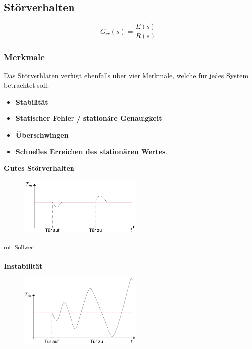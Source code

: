 \documentclass[
  10pt,
  a4paper,
  twocolumn]{article}
\providecommand{\tightlist}{%
  \setlength{\itemsep}{0pt}\setlength{\parskip}{0pt}}\usepackage{longtable,booktabs,array}
\numberwithin{equation}{section}
\begin{document}
\hypertarget{stuxf6rverhalten}{%
\subsection{Störverhalten}\label{stuxf6rverhalten}}

\[
G_{er}(s)=\frac{E(s)}{R(s)}
\]

\hypertarget{merkmale-1}{%
\subsubsection{Merkmale}\label{merkmale-1}}

Das Störverhlaten verfügt ebenfalls über vier Merkmale, welche für jedes
System betrachtet soll:

\begin{itemize}
\tightlist
\item
  \textbf{Stabilität}
\item
  \textbf{Statischer Fehler /} \textbf{stationäre Genauigkeit}
\item
  \textbf{Überschwingen}
\item
  \textbf{Schnelles Erreichen des stationären Wertes}.
\end{itemize}

\textbf{Gutes Störverhalten}

\begin{figure}[H]

{\centering \includegraphics[width=6cm,height=\textheight]{images/storverhalten/gutes_verhalten.png}

}

\end{figure}

\textsuperscript{rot: Sollwert}

\textbf{Instabilität}

\begin{figure}[H]

{\centering \includegraphics[width=6cm,height=\textheight]{images/storverhalten/storverhalten_stability.png}

}

\end{figure}
\end{document}
